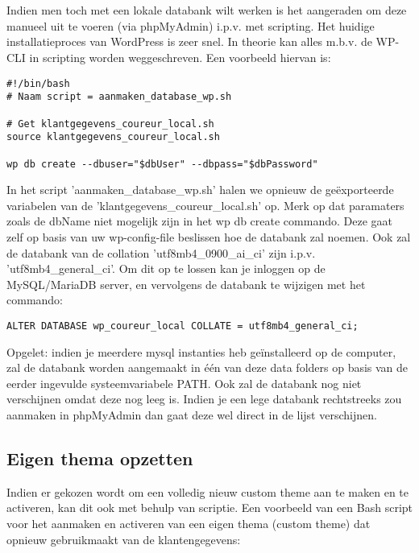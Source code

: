\\\\
Indien men toch met een lokale databank wilt werken is het aangeraden om deze manueel uit te voeren (via phpMyAdmin) i.p.v. met scripting. Het huidige installatieproces van WordPress is zeer snel. In theorie kan alles m.b.v. de WP-CLI in scripting worden weggeschreven. Een voorbeeld hiervan is:
\begin{verbatim}
#!/bin/bash
# Naam script = aanmaken_database_wp.sh

# Get klantgegevens_coureur_local.sh
source klantgegevens_coureur_local.sh

wp db create --dbuser="$dbUser" --dbpass="$dbPassword"
\end{verbatim}
In het script 'aanmaken\_database\_wp.sh' halen we opnieuw de geëxporteerde variabelen van de 'klantgegevens\_coureur\_local.sh' op. Merk op dat paramaters zoals de dbName niet mogelijk zijn in het wp db create commando. Deze gaat zelf op basis van uw wp-config-file beslissen hoe de databank zal noemen. Ook zal de databank van de collation 'utf8mb4\_0900\_ai\_ci' zijn i.p.v. 'utf8mb4\_general\_ci'. Om dit op te lossen kan je inloggen op de MySQL/MariaDB server, en vervolgens de databank te wijzigen met het commando:
\begin{verbatim}
ALTER DATABASE wp_coureur_local COLLATE = utf8mb4_general_ci;
\end{verbatim}
Opgelet: indien je meerdere mysql instanties heb geïnstalleerd op de computer, zal de databank worden aangemaakt in één van deze data folders op basis van de eerder ingevulde systeemvariabele PATH. Ook zal de databank nog niet verschijnen omdat deze nog leeg is. Indien je een lege databank rechtstreeks zou aanmaken in phpMyAdmin dan gaat deze wel direct in de lijst verschijnen.
\label{eigen_thema_script}\subsection{Eigen thema opzetten}
Indien er gekozen wordt om een volledig nieuw custom theme aan te maken en te activeren, kan dit ook met behulp van scriptie.
Een voorbeeld van een Bash script voor het aanmaken en activeren van een eigen thema (custom theme) dat opnieuw gebruikmaakt van de klantengegevens:
